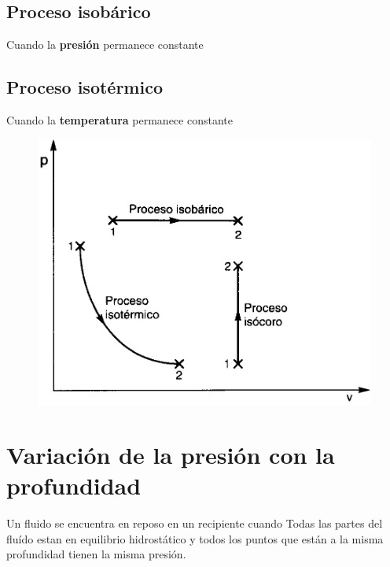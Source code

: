\documentclass[12pt,twocolumn,a4paper]{report}
\begin{document}
\subsection*{Proceso isobárico}
Cuando la \textbf{presión} permanece constante


\subsection*{Proceso isotérmico}
Cuando la \textbf{temperatura} permanece constante

\begin{figure}[H]
	\centering	
	\includegraphics[scale=0.25]{graficos/todos.jpeg}	
\end{figure}

\section*{Variación de la presión con la profundidad}
Un fluido se encuentra en reposo en un recipiente cuando
Todas las partes del fluído estan en equilibrio hidrostático y todos los puntos que están a la misma profundidad tienen la misma presión.
\end{document}
